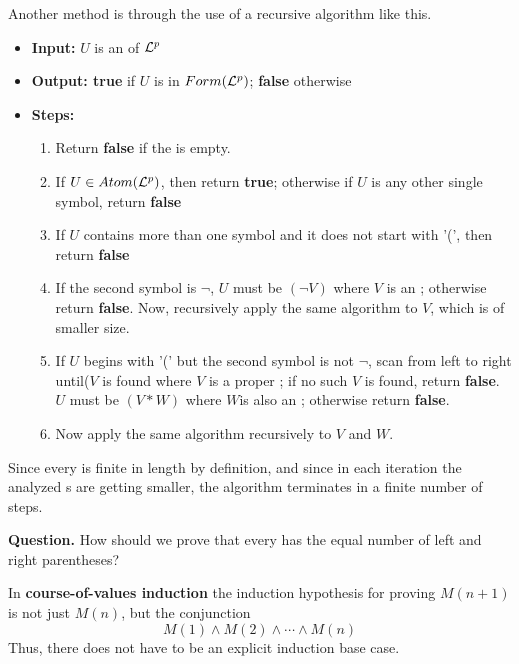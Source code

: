 \documentclass[english, 11pt]{article}
\begin{document}
  Another method is through the use of a recursive algorithm like this.

  \begin{itemize}
    \item \textbf{Input:} $U$ is an  of $\mathcal{L}^p$
    \item \textbf{Output: true} if $U$ is in $Form(\mathcal{L}^p)$; \textbf{false} otherwise
    \item \textbf{Steps:}
    \begin{enumerate}
      \item Return \textbf{false} if the  is empty.
      \item If $U \in Atom(\mathcal{L}^p)$, then return \textbf{true}; otherwise if $U$ is any other single symbol, return \textbf{false}
      \item If $U$ contains more than one symbol and it does not start with '(', then return \textbf{false}
      \item If the second symbol is $\neg$, $U$ must be $(\neg V)$ where $V$ is an ; otherwise return \textbf{false}. Now, recursively apply the same algorithm to $V$, which is of smaller size.
      \item If $U$ begins with '(' but the second symbol is not $\neg$, scan from left to right until($V$  is found where $V$ is a proper ; if no such $V$ is found, return \textbf{false}. $U$ must be $(V*W)$ where $W$is also an ; otherwise return \textbf{false}.
      \item Now apply the same algorithm recursively to $V$ and $W$.
    \end{enumerate}
  \end{itemize}

  Since every  is finite in length by definition, and since in each iteration the analyzed s are getting smaller, the algorithm terminates in a finite number of steps.

  \textbf{Question.} How should we prove that every  has the equal number of left and right parentheses?

  \begin{rem}
    In \textbf{course-of-values induction} the induction hypothesis for proving $M(n+1)$ is not just $M(n)$, but the conjunction
    \[ M(1) \land M(2) \land \cdots \land M(n) \]
    Thus, there does not have to be an explicit induction base case.
  \end{rem}
\end{document}
